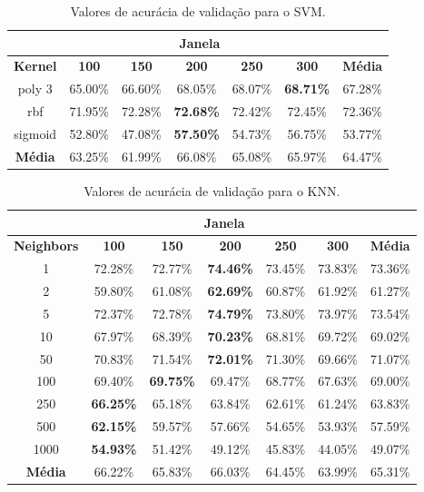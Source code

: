 \begin{table}[h!]
\caption{Valores de acurácia de validação para o SVM.} 
\label{table:svm_results}
\centering
\small
\begin{tabular}{ccccccc}
\cmidrule(l){2-6}
\textbf{} & \multicolumn{5}{c}{\textbf{Janela}} \\ \midrule
\textbf{Kernel} & \textbf{100} & \textbf{150} & \textbf{200} & \textbf{250} & \textbf{300} & \textbf{Média} \\ \midrule
poly 3 & 65.00\% & 66.60\% & 68.05\% & 68.07\% & \textbf{68.71\%} & 67.28\% \\ \midrule
rbf & 71.95\% & 72.28\% & \textbf{72.68\%} & 72.42\% & 72.45\% & 72.36\% \\ \midrule
sigmoid & 52.80\% & 47.08\% & \textbf{57.50\%} & 54.73\% & 56.75\% & 53.77\% \\ \midrule
\textbf{Média} & 63.25\% & 61.99\% & 66.08\% & 65.08\% & 65.97\% & 64.47\% \\ \bottomrule
\end{tabular}
\end{table}

\begin{table}[h!]
\caption{Valores de acurácia de validação para o KNN.} 
\label{table:knn_results}
\centering
\small
\begin{tabular}{ccccccc}
\cmidrule(l){2-6}
\textbf{} & \multicolumn{5}{c}{\textbf{Janela}} \\ \midrule
\textbf{Neighbors} & \textbf{100} & \textbf{150} & \textbf{200} & \textbf{250} & \textbf{300} & \textbf{Média} \\ \midrule
1 & 72.28\% & 72.77\% & \textbf{74.46\%} & 73.45\% & 73.83\% & 73.36\% \\ \midrule
2 & 59.80\% & 61.08\% & \textbf{62.69\%} & 60.87\% & 61.92\% & 61.27\% \\ \midrule
5 & 72.37\% & 72.78\% & \textbf{74.79\%} & 73.80\% & 73.97\% & 73.54\% \\ \midrule
10 & 67.97\% & 68.39\% & \textbf{70.23\%} & 68.81\% & 69.72\% & 69.02\% \\ \midrule
50 & 70.83\% & 71.54\% & \textbf{72.01\%} & 71.30\% & 69.66\% & 71.07\% \\ \midrule
100 & 69.40\% & \textbf{69.75\%} & 69.47\% & 68.77\% & 67.63\% & 69.00\% \\ \midrule
250 & \textbf{66.25\%} & 65.18\% & 63.84\% & 62.61\% & 61.24\% & 63.83\%\\ \midrule
500 & \textbf{62.15\%} & 59.57\% & 57.66\% & 54.65\% & 53.93\% & 57.59\% \\ \midrule
1000 & \textbf{54.93\%} & 51.42\% & 49.12\% & 45.83\% & 44.05\% & 49.07\% \\ \midrule
\textbf{Média} & 66.22\% & 65.83\% & 66.03\% & 64.45\% & 63.99\% & 65.31\% \\ \bottomrule
\end{tabular}
\end{table}

